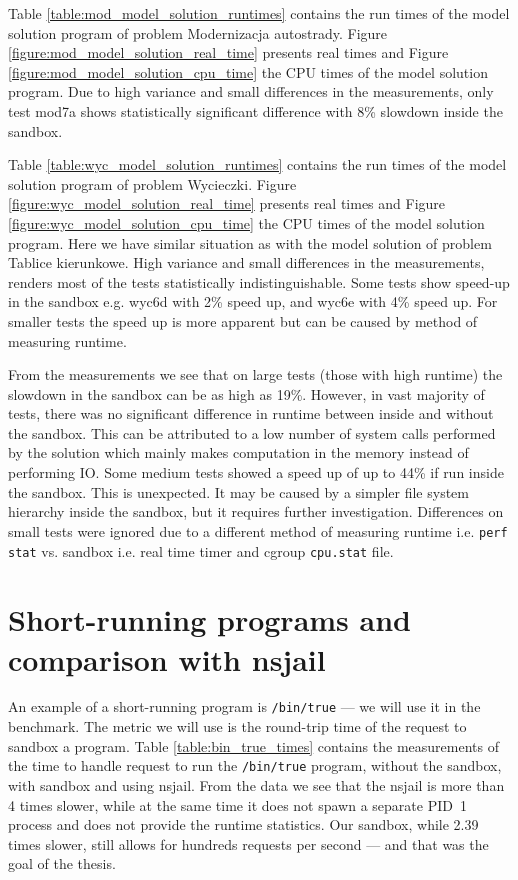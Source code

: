 \documentclass[en]{pracamgr}
\begin{document}
Table \ref{table:mod_model_solution_runtimes} contains the run times of the model solution program of problem Modernizacja autostrady. Figure \ref{figure:mod_model_solution_real_time} presents real times and Figure \ref{figure:mod_model_solution_cpu_time} the CPU times of the model solution program. Due to high variance and small differences in the measurements, only test mod7a shows statistically significant difference with 8\% slowdown inside the sandbox.

Table \ref{table:wyc_model_solution_runtimes} contains the run times of the model solution program of problem Wycieczki. Figure \ref{figure:wyc_model_solution_real_time} presents real times and Figure \ref{figure:wyc_model_solution_cpu_time} the CPU times of the model solution program. Here we have similar situation as with the model solution of problem Tablice kierunkowe. High variance and small differences in the measurements, renders most of the tests statistically indistinguishable. Some tests show speed-up in the sandbox e.g. wyc6d with 2\% speed up, and wyc6e with 4\% speed up. For smaller tests the speed up is more apparent but can be caused by method of measuring runtime.

From the measurements we see that on large tests (those with high runtime) the slowdown in the sandbox can be as high as 19\%. However, in vast majority of tests, there was no significant difference in runtime between inside and without the sandbox. This can be attributed to a low number of system calls performed by the solution which mainly makes computation in the memory instead of performing IO. Some medium tests showed a speed up of up to 44\% if run inside the sandbox. This is unexpected. It may be caused by a simpler file system hierarchy inside the sandbox, but it requires further investigation. Differences on small tests were ignored due to a different method of measuring runtime i.e. \texttt{perf stat} vs. sandbox i.e. real time timer and cgroup \texttt{cpu.stat} file.

\section{Short-running programs and comparison with nsjail}

An example of a short-running program is \texttt{/bin/true} --- we will use it in the benchmark. The metric we will use is the round-trip time of the request to sandbox a program. Table \ref{table:bin_true_times} contains the measurements of the time to handle request to run the \texttt{/bin/true} program, without the sandbox, with sandbox and using nsjail. From the data we see that the nsjail is more than 4 times slower, while at the same time it does not spawn a separate PID~1 process and does not provide the runtime statistics. Our sandbox, while 2.39 times slower, still allows for hundreds requests per second --- and that was the goal of the thesis.
\end{document}
